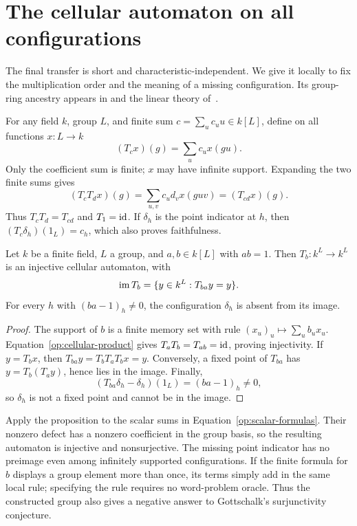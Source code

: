 \section{The cellular automaton on all configurations}
\label{op:cellular-section}

The final transfer is short and characteristic-independent. We give it
locally to fix the multiplication order and the meaning of a missing
configuration. Its group-ring ancestry appears in
\cite[Section~1]{ElekSzabo2004} and the linear theory
of~\cite{CSCCoornaert2006}.

For any field $k$, group $L$, and finite sum $c=\sum_uc_u u\in k[L]$,
define on all functions $x:L\to k$
\[
 (T_cx)(g)=\sum_uc_u x(gu).
\]
Only the coefficient sum is finite; $x$ may have infinite support.
Expanding the two finite sums gives
\begin{equation}\label{op:cellular-product}
 (T_cT_dx)(g)=\sum_{u,v}c_ud_vx(guv)=(T_{cd}x)(g).
\end{equation}
Thus $T_cT_d=T_{cd}$ and $T_1=\mathrm{id}$. If $\delta_h$ is the point
indicator at $h$, then $(T_c\delta_h)(1_L)=c_h$, which also proves
faithfulness.

\begin{proposition}\label{op:cellular}
Let $k$ be a finite field, $L$ a group, and $a,b\in k[L]$ with $ab=1$.
Then $T_b:k^L\to k^L$ is an injective cellular automaton, with
\[
 \operatorname{im} T_b=\{y\in k^L:T_{ba}y=y\}.
\]
For every $h$ with $(ba-1)_h\ne0$, the configuration $\delta_h$ is
absent from its image.
\end{proposition}
\begin{proof}
The support of $b$ is a finite memory set with rule
$(x_u)_u\mapsto\sum_u b_ux_u$. Equation~\eqref{op:cellular-product}
gives $T_aT_b=T_{ab}=\mathrm{id}$, proving injectivity. If $y=T_bx$, then
$T_{ba}y=T_bT_aT_bx=y$. Conversely, a fixed point of $T_{ba}$ has
$y=T_b(T_ay)$, hence lies in the image. Finally,
\[
 (T_{ba}\delta_h-\delta_h)(1_L)=(ba-1)_h\ne0,
\]
so $\delta_h$ is not a fixed point and cannot be in the image.
\end{proof}

Apply the proposition to the scalar sums in
Equation~\eqref{op:scalar-formulas}. Their nonzero defect has a
nonzero coefficient in the group basis, so the resulting automaton is
injective and nonsurjective. The missing point indicator has no
preimage even among infinitely supported configurations. If the finite
formula for $b$ displays a group element more than once, its terms
simply add in the same local rule; specifying the rule requires no
word-problem oracle.
Thus the constructed group also gives a negative answer to Gottschalk's
surjunctivity conjecture.

